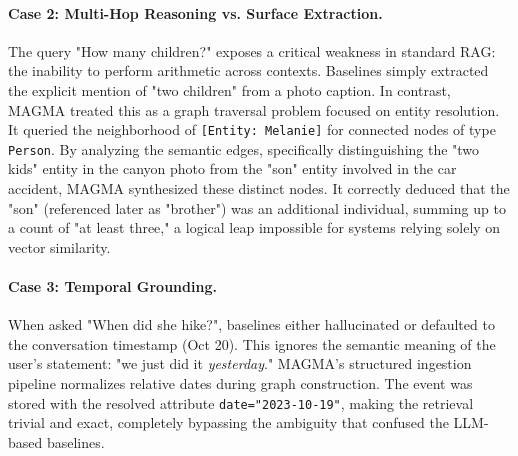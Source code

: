 \documentclass[11pt]{article}
\begin{document}
\paragraph{Case 2: Multi-Hop Reasoning vs. Surface Extraction.}
The query "How many children?" exposes a critical weakness in standard RAG: the inability to perform arithmetic across contexts. Baselines simply extracted the explicit mention of "two children" from a photo caption. In contrast, MAGMA treated this as a graph traversal problem focused on entity resolution. It queried the neighborhood of \texttt{[Entity: Melanie]} for connected nodes of type \texttt{Person}. By analyzing the semantic edges, specifically distinguishing the "two kids" entity in the canyon photo from the "son" entity involved in the car accident, MAGMA synthesized these distinct nodes. It correctly deduced that the "son" (referenced later as "brother") was an additional individual, summing up to a count of "at least three," a logical leap impossible for systems relying solely on vector similarity.

\paragraph{Case 3: Temporal Grounding.}
When asked "When did she hike?", baselines either hallucinated or defaulted to the conversation timestamp (Oct 20). This ignores the semantic meaning of the user's statement: "we just did it \textit{yesterday}." MAGMA's structured ingestion pipeline normalizes relative dates during graph construction. The event was stored with the resolved attribute \texttt{date="2023-10-19"}, making the retrieval trivial and exact, completely bypassing the ambiguity that confused the LLM-based baselines.
\end{document}
